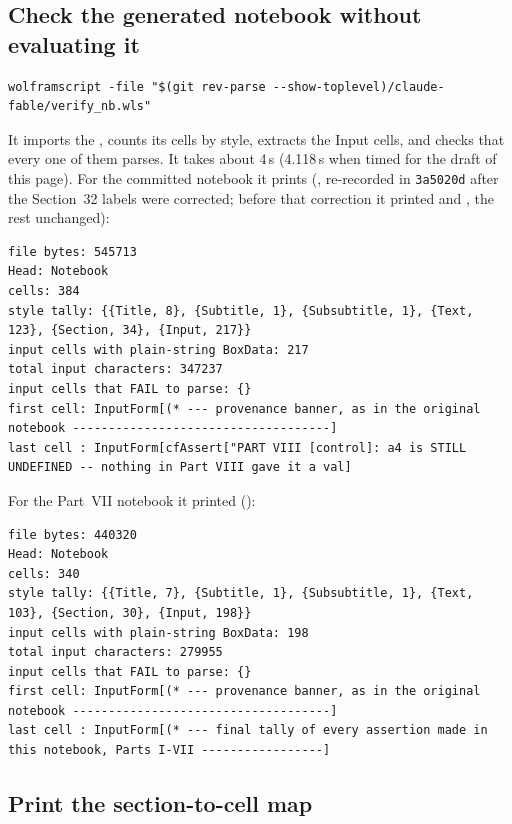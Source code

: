 \subsection{Check the generated notebook without evaluating it}
\label{sec:11.3}

\begin{Verbatim}
wolframscript -file "$(git rev-parse --show-toplevel)/claude-fable/verify_nb.wls"
\end{Verbatim}

It imports the , counts its cells by style, extracts the Input cells, and checks that every
one of them parses. It takes about 4\,s (4.118\,s when timed for the draft of this page). For the
committed notebook it prints (, re-recorded in \texttt{3a5020d}
after the Section~32 labels were corrected; before that correction it printed
 and , the rest unchanged):

\begin{Verbatim}[fontsize=\scriptsize]
file bytes: 545713
Head: Notebook
cells: 384
style tally: {{Title, 8}, {Subtitle, 1}, {Subsubtitle, 1}, {Text, 123}, {Section, 34}, {Input, 217}}
input cells with plain-string BoxData: 217
total input characters: 347237
input cells that FAIL to parse: {}
first cell: InputForm[(* --- provenance banner, as in the original notebook ------------------------------------]
last cell : InputForm[cfAssert["PART VIII [control]: a4 is STILL UNDEFINED -- nothing in Part VIII gave it a val]
\end{Verbatim}

For the Part~VII notebook it printed ():

\begin{Verbatim}[fontsize=\scriptsize]
file bytes: 440320
Head: Notebook
cells: 340
style tally: {{Title, 7}, {Subtitle, 1}, {Subsubtitle, 1}, {Text, 103}, {Section, 30}, {Input, 198}}
input cells with plain-string BoxData: 198
total input characters: 279955
input cells that FAIL to parse: {}
first cell: InputForm[(* --- provenance banner, as in the original notebook ------------------------------------]
last cell : InputForm[(* --- final tally of every assertion made in this notebook, Parts I-VII -----------------]
\end{Verbatim}

\subsection{Print the section-to-cell map}
\label{sec:11.4}

